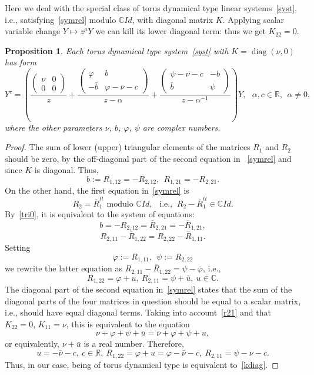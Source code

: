 \documentclass[preprint,12pt]{elsarticle}
\theoremstyle{plain}
\newtheorem{proposition}[theorem]{Proposition}
\renewcommand{\phi}{\varphi}
\DeclareMathOperator{\diag}{\mathrm{diag}}
\numberwithin{equation}{section}
\numberwithin{equation}{section}
\begin{document}
Here we deal with the special class of torus dynamical type linear systems~\eqref{syst}, i.e., satisfying~\eqref{symrel} modulo $\mathbb{C} Id$, with diagonal matrix $K$. 
Applying scalar variable change $Y\mapsto z^\mu Y$ we can kill  its lower diagonal term: thus we get $K_{22}=0$. 
\begin{proposition} \label{ptdiag} Each torus dynamical type system~\eqref{syst} with $K=\diag(\nu,0)$ has form  
\begin{equation}Y'=\left(\frac{\left(\begin{matrix}\nu & 0\\ 0 & 0\end{matrix}\right)}z+
\frac{\left(\begin{matrix}\phi & b\\ -\bar b & \phi-\bar\nu-c\end{matrix}\right)}{z-\alpha}  + \frac{\left(\begin{matrix}\psi-\nu-c & 
-b\\ \bar b & \psi\end{matrix}\right)}{z-\alpha^{-1}}\right)Y, \ \ \ \alpha, c\in\mathbb{R},\ \ \alpha\neq0, \label{kdiag}\end{equation}
where the other parameters $\nu$, $b$, $\phi$, $\psi$ are complex numbers.
\end{proposition}
\begin{proof} The sum of  lower (upper) triangular elements of the matrices $R_1$ and $R_2$ 
should be zero, by the off-diagonal part of the second equation in 
~\eqref{symrel} and since $K$ is diagonal. Thus, 
 \begin{equation} b:=R_{1,12}=-R_{2,12}, \ \ R_{1,21}=-R_{2,21}.\label{tri0}\end{equation}
 On the other hand, the first equation in~\eqref{symrel} is 
 $$R_2=\overline R_1^{tt} \text{ modulo } \mathbb{C} Id, \ \ \text{ i.e., } \ R_2-\overline R_1^{tt}\in\mathbb{C} Id.$$
  By~\eqref{tri0}, it is equivalent to the  system of equations:
 \begin{equation}b=-R_{2,12}=\overline R_{2,21}=-\overline R_{1,21},\label{b=}\end{equation}
$$R_{2,11}-\overline R_{1,22}=R_{2,22}-\overline R_{1,11}.$$
  Setting 
 $$\phi:=R_{1,11}, \ \ \psi:=R_{2,22}$$
 we rewrite the latter equation as $R_{2,11}-\overline R_{1,22}=\psi-\bar\phi$, i.e., 
 \begin{equation}R_{1,22}=\phi+u, \ R_{2,11}=\psi+\bar u, \ u\in\mathbb{C}.\label{r21}\end{equation} 
The diagonal part of the second equation in~\eqref{symrel} states that the sum of the diagonal parts of the four matrices in question 
should be equal to a scalar matrix, i.e., should have equal diagonal terms. Taking into account~\eqref{r21} and that $K_{22}=0$,  $K_{11}=\nu$, this is equivalent to the equation   
$$\nu+\phi+\psi+\bar u=\bar\nu+\phi+\psi+u,$$
or equivalently, $\nu+\bar u$ is a real number. Therefore, 
$$u=-\bar\nu-c, \ c\in\mathbb{R}, \ R_{1,22}=\phi+u=\phi-\bar\nu-c, \ R_{2,11}=\psi-\nu-c.$$
Thus, in our case, being of torus dynamical type is equivalent to~\eqref{kdiag}.
\end{proof}
\end{document}
